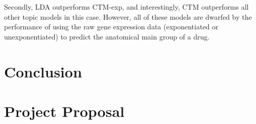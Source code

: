 \documentclass[12pt,a4paper,twoside,openright]{report}
\begin{document}
Secondly, LDA outperforms CTM-exp, and interestingly, CTM outperforms all other topic models in this case. However, all of these models are dwarfed by the performance of using the raw gene expression data (exponentiated or unexponentiated) to predict the anatomical main group of a drug.

\chapter{Conclusion}



\appendix

\chapter{Project Proposal}


\end{document}
